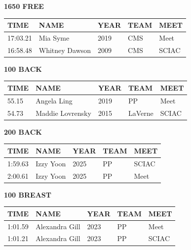 \begin{table}[H]
\centering
\begin{minipage}[t]{0.48\textwidth}
\centering
\textbf{1650 FREE}\\[0.1cm]
\begin{tabular}{@{}p{1.8cm}p{2.8cm}p{1.2cm}p{1.4cm}p{1.4cm}@{}}
\hline
    \textbf{TIME} & \textbf{NAME} & \textbf{YEAR} & \textbf{TEAM} & \textbf{MEET} \\
\hline
    17:03.21 & Mia Syme & 2019 & CMS & Meet \\
    16:58.48 & Whitney Dawson & 2009 & CMS & SCIAC \\
\hline
\end{tabular}
\end{minipage}\hfill
\begin{minipage}[t]{0.48\textwidth}
\centering
\textbf{100 BACK}\\[0.1cm]
\begin{tabular}{@{}p{1.8cm}p{2.8cm}p{1.2cm}p{1.4cm}p{1.4cm}@{}}
\hline
    \textbf{TIME} & \textbf{NAME} & \textbf{YEAR} & \textbf{TEAM} & \textbf{MEET} \\
\hline
    55.15 & Angela Ling & 2019 & PP & Meet \\
    54.73 & Maddie Lovrensky & 2015 & LaVerne & SCIAC \\
\hline
\end{tabular}
\end{minipage}
\end{table}

\begin{table}[H]
\centering
\begin{minipage}[t]{0.48\textwidth}
\centering
\textbf{200 BACK}\\[0.1cm]
\begin{tabular}{@{}p{1.8cm}p{2.8cm}p{1.2cm}p{1.4cm}p{1.4cm}@{}}
\hline
    \textbf{TIME} & \textbf{NAME} & \textbf{YEAR} & \textbf{TEAM} & \textbf{MEET} \\
\hline
    1:59.63 & Izzy Yoon & 2025 & PP & SCIAC \\
    2:00.61 & Izzy Yoon & 2025 & PP & Meet \\
\hline
\end{tabular}
\end{minipage}\hfill
\begin{minipage}[t]{0.48\textwidth}
\centering
\textbf{100 BREAST}\\[0.1cm]
\begin{tabular}{@{}p{1.8cm}p{2.8cm}p{1.2cm}p{1.4cm}p{1.4cm}@{}}
\hline
    \textbf{TIME} & \textbf{NAME} & \textbf{YEAR} & \textbf{TEAM} & \textbf{MEET} \\
\hline
    1:01.59 & Alexandra Gill & 2023 & PP & Meet \\
    1:01.21 & Alexandra Gill & 2023 & PP & SCIAC \\
\hline
\end{tabular}
\end{minipage}
\end{table}

